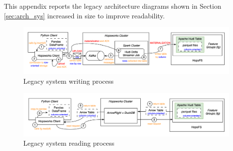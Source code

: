 This appendix reports the legacy architecture diagrams shown in Section \ref{sec:arch_sys} increased in size to improve readability.

\begin{figure}
    \begin{center}
      \includegraphics[angle=90,origin=c]{figures/2-background/FeatureStore-writing.png}
    \end{center}
    \caption{Legacy system writing process}
    \label{fig:appx_featurestore_writing}
\end{figure}

\begin{figure}
    \begin{center}
      \includegraphics[angle=90,origin=c]{figures/2-background/FeatureStore-reading.png}
    \end{center}
    \caption{Legacy system reading process}
    \label{fig:appx_featurestore_reading}
\end{figure}